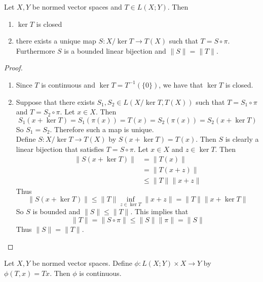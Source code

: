 \documentclass{book}
\begin{document}
	\begin{ex} \lex{}
		Let $X,Y$ be normed vector spaces and $T \in L(X; Y)$. Then
		\begin{enumerate}
			\item $\ker T$ is closed
			\item there exists a unique map $S :X/ \ker T \rightarrow T(X)$ such that $T = S \circ \pi$. Furthermore $S$ is a bounded linear bijection and $\|S \|= \|T \|$.
		\end{enumerate}
	\end{ex}
	
	\begin{proof}\
		\begin{enumerate}
			\item Since $T$ is continuous and $\ker T = T^{-1}(\{0\})$, we have that $\ker T$ is closed.
			\item Suppose that there exists $S_1,S_2 \in L(X/ \ker T, T(X)) $ such that $T = S_1 \circ \pi$ and  $T = S_2 \circ \pi $. Let $x \in X$. Then $$S_1(x + \ker T) = S_1(\pi(x)) = T(x) = S_2(\pi(x)) = S_2(x + \ker T)$$ So $S_1 = S_2$. Therefore such a map is unique.\\
			Define $S: X / \ker T \rightarrow T(X)$ by $S(x+ \ker T) = T(x)$. Then $S$ is clearly a linear bijection that satisfies $T = S \circ \pi$. Let $x \in X$ and $z \in \ker T$. Then 
			\begin{align*}
				\|S(x+ \ker T) \|
				& = \|T(x) \|\\
				& = \|T(x+z) \|\\
				& \leq \|T \|\|x+ z \|
			\end{align*} 
			Thus $$\|S(x+ \ker T) \|\leq \|T \|\inf_{z \in \ker T}  \|x + z \|= \|T \|\|x + \ker T \|$$
			So $S$ is bounded and $\|S \|\leq \|T \|$. This implies that $$\|T \|= \|S \circ \pi \|\leq \|S \|\|\pi \|= \|S \|$$
			Thus $\|S \|= \|T \|$.
		\end{enumerate}
	\end{proof}
	
	\begin{ex} \lex{}
		Let $X, Y$ be normed vector spaces. Define $\phi: L(X; Y) \times X \rightarrow Y$ by \\$\phi(T,x) = Tx$. Then $\phi$ is continuous.
	\end{ex}
	
\end{document}

